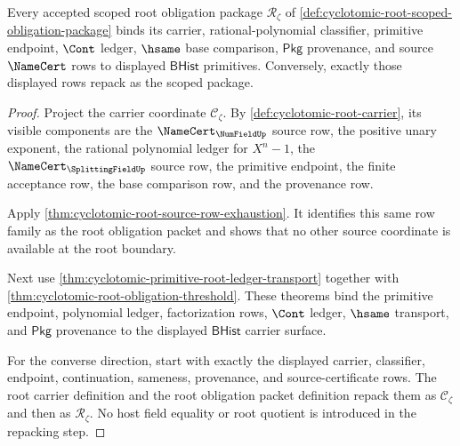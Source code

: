 \begin{theorem}
\label{thm:cyclotomic-root-bhist-scope-binding}
Every accepted scoped root obligation package
$\mathcal{R}_{\zeta}$ of
\autoref{def:cyclotomic-root-scoped-obligation-package} binds its carrier,
rational-polynomial classifier, primitive endpoint, $\Cont$ ledger, $\hsame$
base comparison, $\mathsf{Pkg}$ provenance, and source $\NameCert$ rows to
displayed $\mathsf{BHist}$ primitives. Conversely, exactly those displayed rows
repack as the scoped package.
\end{theorem}
\begin{proof}
Project the carrier coordinate $\mathcal{C}_{\zeta}$. By
\autoref{def:cyclotomic-root-carrier}, its visible components are the
$\NameCert_{\NumFieldUp}$ source row, the positive unary exponent, the
rational polynomial ledger for $X^n-1$, the $\NameCert_{\SplittingFieldUp}$
source row, the primitive endpoint, the finite acceptance row, the base
comparison row, and the provenance row.

Apply \autoref{thm:cyclotomic-root-source-row-exhaustion}. It identifies this
same row family as the root obligation packet and shows that no other source
coordinate is available at the root boundary.

Next use \autoref{thm:cyclotomic-primitive-root-ledger-transport} together
with \autoref{thm:cyclotomic-root-obligation-threshold}. These theorems bind
the primitive endpoint, polynomial ledger, factorization rows, $\Cont$ ledger,
$\hsame$ transport, and $\mathsf{Pkg}$ provenance to the displayed
$\mathsf{BHist}$ carrier surface.

For the converse direction, start with exactly the displayed carrier,
classifier, endpoint, continuation, sameness, provenance, and source-certificate
rows. The root carrier definition and the root obligation packet definition
repack them as $\mathcal{C}_{\zeta}$ and then as
$\mathcal{R}_{\zeta}$. No host field equality or root quotient is introduced in
the repacking step.
\end{proof}

